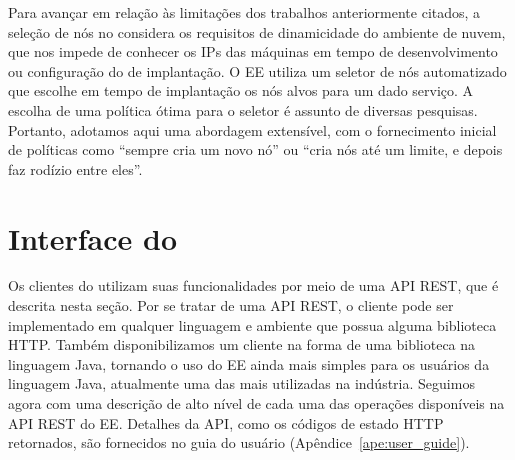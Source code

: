 Para avançar em relação às limitações dos trabalhos anteriormente citados, 
a seleção de nós no \ee
considera os requisitos de dinamicidade do ambiente de nuvem, que nos impede de conhecer os IPs das máquinas 
em tempo de desenvolvimento ou configuração do \script de implantação.
O EE utiliza um seletor de nós automatizado que escolhe em tempo de implantação os nós alvos para um dado serviço.
A escolha de uma política ótima para o seletor é assunto de diversas pesquisas.
Portanto, adotamos aqui uma abordagem extensível, com o fornecimento inicial de políticas como
``sempre cria um novo nó'' ou ``cria nós até um limite, e depois faz rodízio entre eles''.

\section{Interface do \ee}
\label{sec:interface}

Os clientes do \ee utilizam suas funcionalidades por meio de uma API REST, que é descrita nesta seção. 
Por se tratar de uma API REST, o cliente pode ser implementado em qualquer linguagem 
e ambiente que possua alguma biblioteca HTTP. 
Também disponibilizamos um cliente na forma de uma biblioteca na linguagem Java, 
tornando o uso do EE ainda mais simples para os usuários da linguagem Java, 
atualmente uma das mais utilizadas na indústria. 
Seguimos agora com uma descrição de alto nível de cada uma das operações disponíveis 
na API REST do EE. Detalhes da API, como os códigos de estado HTTP retornados, 
são fornecidos no guia do usuário (Apêndice~\ref{ape:user_guide}). 


